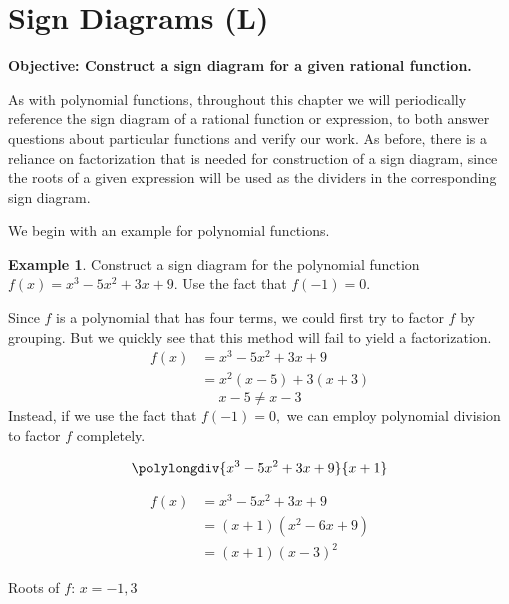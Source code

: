 \documentclass[12pt]{book}
\theoremstyle{definition}
\newtheorem{example}{Example}
\begin{document}
\section{Sign Diagrams (L)}
{\bf Objective: Construct a sign diagram for a given rational function.}\par
As with polynomial functions, throughout this chapter we will periodically reference the sign diagram of a rational function or expression, to both answer questions about particular functions and verify our work.  As before, there is a reliance on factorization that is needed for construction of a sign diagram, since the roots of a given expression will be used as the dividers in the corresponding sign diagram.
\par
We begin with an example for polynomial functions.
\begin{example}\label{sign_diag_0}
Construct a sign diagram for the polynomial function $f(x)=x^3-5x^2+3x+9$.  Use the fact that $f(-1)=0$.
\par
Since $f$ is a polynomial that has four terms, we could first try to factor $f$ by grouping.  But we quickly see that this method will fail to yield a factorization.
\begin{equation*}
\begin{split}
f(x) & = x^3-5x^2+3x+9\\
& = x^2(x-5)+3(x+3)
\end{split}
\end{equation*}
$$x-5\neq x-3$$
Instead, if we use the fact that $f(-1)=0,$ we can employ polynomial division to factor $f$ completely.
\begin{multicols}{2}
\[
  \polylongdiv{x^3-5x^2+3x+9}{x+1}
\]

\columnbreak

\begin{equation*}
\begin{split}
f(x) & = x^3-5x^2+3x+9\\
& = (x+1)(x^2-6x+9)\\
& = (x+1)(x-3)^2
\end{split}
\end{equation*}
\begin{center}
Roots of $f$: $x=-1,3$
\end{center}
\end{multicols}
\begin{center}
\end{center}
\end{example}
\end{document}
